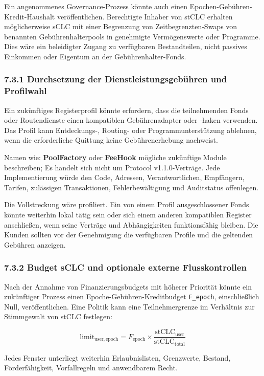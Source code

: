 \documentclass[11pt]{article}
\begin{document}
Ein angenommenes Governance-Prozess könnte auch einen Epochen-Gebühren-Kredit-Haushalt veröffentlichen. Berechtigte Inhaber von stCLC erhalten möglicherweise sCLC mit einer Begrenzung von Zeitbegrenzten-Swaps von benannten Gebührenhalterpools in genehmigte Vermögenswerte oder Programme. Dies wäre ein beleidigter Zugang zu verfügbaren Bestandteilen, nicht passives Einkommen oder Eigentum an der Gebührenhalter-Fonds.

\subsubsection*{7.3.1 Durchsetzung der Dienstleistungsgebühren und Profilwahl}

Ein zukünftiges Registerprofil könnte erfordern, dass die teilnehmenden Fonds oder Routendienste einen kompatiblen Gebührenadapter oder -haken verwenden. Das Profil kann Entdeckungs-, Routing- oder Programmunterstützung ablehnen, wenn die erforderliche Quittung keine Gebührenerhebung nachweist.

Namen wie: \textbf{PoolFactory } oder \textbf{ FeeHook} mögliche zukünftige Module beschreiben; Es handelt sich nicht um Protocol v1.1.0-Verträge. Jede Implementierung würde den Code, Adressen, Verantwortlichen, Empfängern, Tarifen, zulässigen Transaktionen, Fehlerbewältigung und Auditstatus offenlegen.

Die Vollstreckung wäre profiliert. Ein von einem Profil ausgeschlossener Fonds könnte weiterhin lokal tätig sein oder sich einem anderen kompatiblen Register anschließen, wenn seine Verträge und Abhängigkeiten funktionsfähig bleiben. Die Kunden sollten vor der Genehmigung die verfügbaren Profile und die geltenden Gebühren anzeigen.

\subsubsection*{7.3.2 Budget sCLC und optionale externe Flusskontrollen}

Nach der Annahme von Finanzierungsbudgets mit höherer Priorität könnte ein zukünftiger Prozess einen Epoche-Gebühren-Kreditbudget \texttt{F\_epoch}, einschließlich Null, veröffentlichen. Eine Politik kann eine Teilnehmergrenze im Verhältnis zur Stimmgewalt von stCLC festlegen:

\[
\mathrm{limit}_{\mathrm{user,epoch}} = F_{\mathrm{epoch}} \times \frac{\mathrm{stCLC}_{\mathrm{user}}}{\mathrm{stCLC}_{\mathrm{total}}}
\]

Jedes Fenster unterliegt weiterhin Erlaubnislisten, Grenzwerte, Bestand, Förderfähigkeit, Vorfallregeln und anwendbarem Recht.
\end{document}
